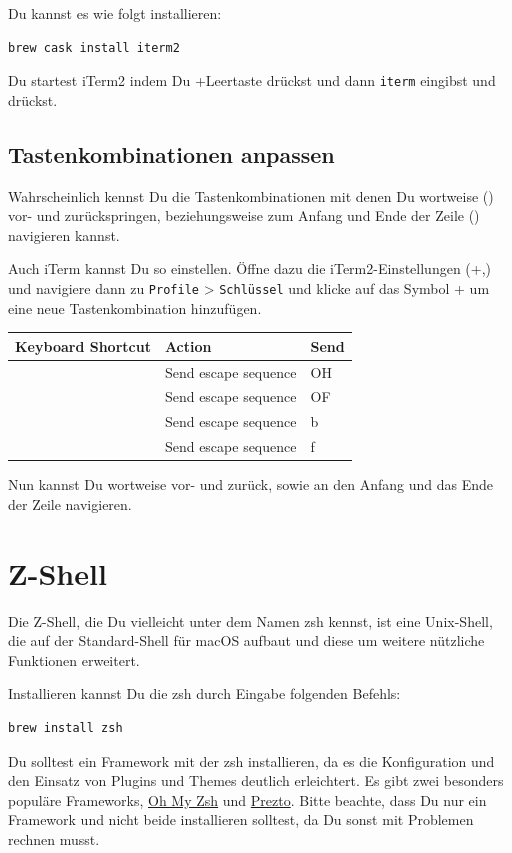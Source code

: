 \documentclass[]{article}
\newcommand{\code}[1]{\texttt{#1}}
\begin{document}
Du kannst es wie folgt installieren:
\begin{verbatim}
brew cask install iterm2
\end{verbatim}

Du startest iTerm2 indem Du \cmdkey+Leertaste drückst und dann \code{iterm} eingibst und \returnkey\, drückst.

\subsection{Tastenkombinationen anpassen}
Wahrscheinlich kennst Du die Tastenkombinationen mit denen Du wortweise (\optkey) vor- und zurückspringen, beziehungsweise zum Anfang und Ende der Zeile (\cmdkey) navigieren kannst.

Auch iTerm kannst Du so einstellen. Öffne dazu die iTerm2-Einstellungen (\cmdkey +,) und navigiere dann zu \code{Profile} > \code{Schlüssel} und klicke  auf das Symbol +  um eine neue Tastenkombination hinzufügen.

\begin{tabular}[t]{lll}
	\toprule
	Keyboard Shortcut & Action & Send \\
	\midrule
	\cmdkey \textleftarrow & Send escape sequence & OH \\
	\cmdkey \textrightarrow & Send escape sequence & OF \\
	\optkey \textleftarrow & Send escape sequence & b \\
	\optkey \textrightarrow & Send escape sequence & f \\
\end{tabular}

Nun kannst Du wortweise vor- und zurück, sowie an den Anfang und das Ende der Zeile navigieren.

\section{Z-Shell}
Die Z-Shell, die Du vielleicht unter dem Namen zsh kennst, ist eine Unix-Shell, die auf der Standard-Shell für macOS aufbaut und diese um weitere nützliche Funktionen erweitert. 

Installieren kannst Du die zsh durch Eingabe folgenden Befehls:
\begin{verbatim}
brew install zsh
\end{verbatim}

Du solltest ein Framework mit der zsh installieren, da es die Konfiguration und den Einsatz von Plugins und Themes deutlich erleichtert. Es gibt zwei besonders populäre Frameworks, \href{https://github.com/robbyrussell/oh-my-zsh}{Oh My Zsh} und \href{https://github.com/sorin-ionescu/prezto}{Prezto}.
Bitte beachte, dass Du nur ein Framework und nicht beide installieren solltest, da Du sonst mit Problemen rechnen musst.
\end{document}
